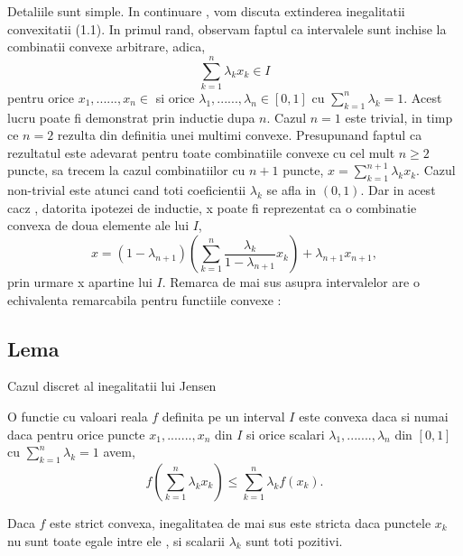 \documentclass[a4paper,12pt,oneside]{report}
\begin{document}
Detaliile sunt simple. 
In continuare , vom discuta extinderea inegalitatii convexitatii (1.1). In primul rand, observam faptul ca intervalele sunt inchise la combinatii convexe arbitrare, adica, 
\begin{displaymath}
  \sum_{ k= 1}^{n}\lambda _{k}x_{k} \in I
\end{displaymath}
pentru orice \(x_{1},......, x_{n} \in\)  si orice \(\lambda _{1},......, \lambda _{n} \in \left [ 0 , 1  \right ]\) cu \(\sum_{k = 1}^{n} \lambda _{k} = 1\). Acest lucru poate fi demonstrat prin inductie dupa \(n\). Cazul \(n=1\) este trivial, in timp ce \(n = 2\) rezulta din definitia unei multimi convexe. Presupunand faptul ca rezultatul este adevarat pentru toate combinatiile convexe cu cel mult \(n\geq 2\) puncte, sa trecem la cazul combinatiilor cu \(n + 1\) puncte, \(x = \sum_{k = 1}^{n + 1} \lambda _{k}x_{k}\). Cazul non-trivial este atunci cand toti coeficientii \(\lambda _{k}\) se afla in \(\left ( 0 , 1 \right )\). Dar in acest cacz , datorita ipotezei de inductie, x poate fi reprezentat ca o combinatie convexa de doua elemente ale lui \(I\), 
\begin{displaymath}
  x = \left ( 1 - \lambda _{n + 1} \right )\left ( \sum_{k = 1}^{n} \frac{\lambda _{k}}{1 - \lambda _{n + 1}} x_{k}\right ) + \lambda _{n + 1}x_{n + 1},
\end{displaymath}
prin urmare x apartine lui \(I\). 
	Remarca de mai sus asupra intervalelor are o echivalenta remarcabila pentru functiile convexe :

\subsection{Lema}
Cazul discret al inegalitatii lui Jensen

O functie cu valoari reala \(f\) definita pe un interval \(I\) este convexa daca si numai daca pentru orice puncte \(x_{1},.......,x_{n}\) din \(I\) si orice scalari \(\lambda _{1},.......,\lambda _{n}\) din \(\left [ 0 , 1 \right ]\) cu \(\sum_{k = 1}^{n}\lambda _{k}= 1\) avem, 
\begin{displaymath}
  f\left ( \sum_{k = 1}^{n} \lambda _{k}x_{k}\right )\leq \sum_{k = 1}^{n}\lambda _{k}f\left ( x_{k} \right ).
\end{displaymath}

Daca \(f\) este strict convexa, inegalitatea de mai sus este stricta daca punctele \(x_{k}\) nu sunt toate egale intre ele , si scalarii \(\lambda _{k}\) sunt toti pozitivi. 
\end{document}

